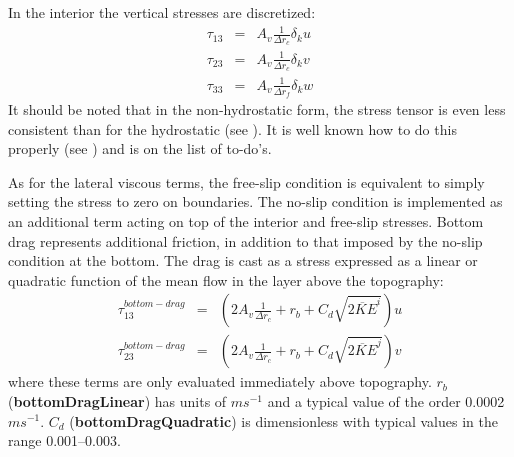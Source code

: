 In the interior the vertical stresses are discretized:
\begin{eqnarray}
\tau_{13} & = & A_v \frac{1}{\Delta r_c} \delta_k u \\
\tau_{23} & = & A_v \frac{1}{\Delta r_c} \delta_k v \\
\tau_{33} & = & A_v \frac{1}{\Delta r_f} \delta_k w
\end{eqnarray}
It should be noted that in the non-hydrostatic form, the stress tensor
is even less consistent than for the hydrostatic (see
\cite{wajsowicz:93}). It is well known how to do this properly (see 
\cite{griffies:00}) and is on the list of to-do's.



As for the lateral viscous terms, the free-slip condition is
equivalent to simply setting the stress to zero on boundaries.  The
no-slip condition is implemented as an additional term acting on top
of the interior and free-slip stresses. Bottom drag represents
additional friction, in addition to that imposed by the no-slip
condition at the bottom. The drag is cast as a stress expressed as a
linear or quadratic function of the mean flow in the layer above the
topography:
\begin{eqnarray}
\tau_{13}^{bottom-drag} & = &
\left(
2 A_v \frac{1}{\Delta r_c}
+ r_b
+ C_d \sqrt{ \overline{2 KE}^i }
\right) u \\
\tau_{23}^{bottom-drag} & = &
\left(
2 A_v \frac{1}{\Delta r_c}
+ r_b
+ C_d \sqrt{ \overline{2 KE}^j }
\right) v
\end{eqnarray}
where these terms are only evaluated immediately above topography.
$r_b$ ({\bf bottomDragLinear}) has units of $m s^{-1}$ and a typical value
of the order 0.0002 $m s^{-1}$. $C_d$ ({\bf bottomDragQuadratic}) is
dimensionless with typical values in the range 0.001--0.003.


